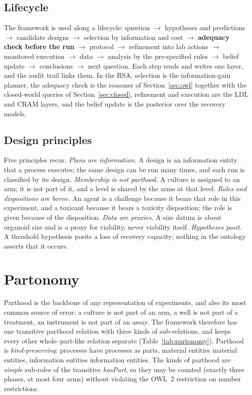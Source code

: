 \documentclass[10pt,a4paper]{article}
\begin{document}
\subsection{Lifecycle}
The framework is used along a lifecycle: question $\rightarrow$ hypotheses and predictions $\rightarrow$ candidate
designs $\rightarrow$ selection by information and cost $\rightarrow$ \textbf{adequacy check before the run}
$\rightarrow$ protocol $\rightarrow$ refinement into lab actions $\rightarrow$ monitored execution $\rightarrow$ data
$\rightarrow$ analysis by the pre-specified rules $\rightarrow$ belief update $\rightarrow$ conclusions $\rightarrow$ next
question. Each step reads and writes one layer, and the audit trail links them. In the RSA, selection is the
information-gain planner, the adequacy check is the reasoner of Section~\ref{sec:owl} together with the closed-world
queries of Section~\ref{sec:closed}, refinement and execution are the LDL and CRAM layers, and the belief update is
the posterior over the recovery models.

\subsection{Design principles}
Five principles recur. \emph{Plans are information.} A design is an information entity that a process executes;
the same design can be run many times, and each run is classified by its design. \emph{Membership is not
parthood.} A culture is assigned to an arm; it is not part of it, and a level is shared by the arms at that level.
\emph{Roles and dispositions are borne.} An agent is a challenge because it bears that role in this experiment, and a
toxicant because it bears a toxicity disposition; the role is given because of the disposition. \emph{Data are
proxies.} A size datum is about organoid size and is a proxy for viability, never viability itself. \emph{Hypotheses
posit.} A threshold hypothesis posits a loss of recovery capacity; nothing in the ontology asserts that it occurs.


\section{Partonomy}\label{sec:partonomy}
Parthood is the backbone of any representation of experiments, and also its most common source of error: a culture is
not part of an arm, a well is not part of a treatment, an instrument is not part of an assay. The framework therefore
has one transitive parthood relation with three kinds of sub-relations, and keeps every other whole--part-like
relation separate (Table~\ref{tab:partonomy}). Parthood is \emph{kind-preserving}: processes have processes as parts,
material entities material entities, information entities information entities. The kinds of parthood are
\emph{simple} sub-roles of the transitive \emph{hasPart}, so they may be counted (exactly three phases, at most four
arms) without violating the OWL~2 restriction on number restrictions.
\end{document}
